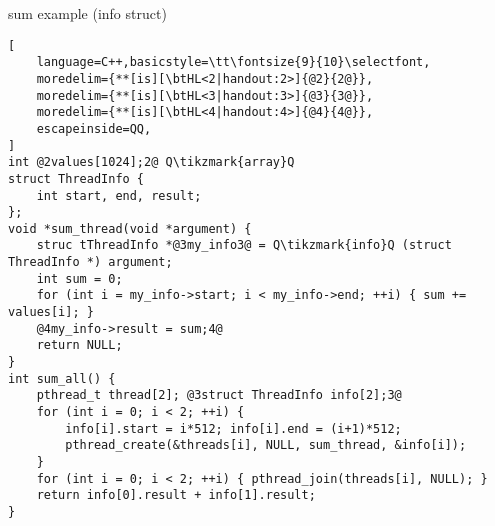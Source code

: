 \begin{frame}[fragile,label=sumToStack]{sum example (info struct)}
\begin{lstlisting}[
    language=C++,basicstyle=\tt\fontsize{9}{10}\selectfont,
    moredelim={**[is][\btHL<2|handout:2>]{@2}{2@}},
    moredelim={**[is][\btHL<3|handout:3>]{@3}{3@}},
    moredelim={**[is][\btHL<4|handout:4>]{@4}{4@}},
    escapeinside=QQ,
]
int @2values[1024];2@ Q\tikzmark{array}Q
struct ThreadInfo {
    int start, end, result;
};
void *sum_thread(void *argument) {
    struc tThreadInfo *@3my_info3@ = Q\tikzmark{info}Q (struct ThreadInfo *) argument;
    int sum = 0;
    for (int i = my_info->start; i < my_info->end; ++i) { sum += values[i]; }
    @4my_info->result = sum;4@
    return NULL;
}
int sum_all() {
    pthread_t thread[2]; @3struct ThreadInfo info[2];3@
    for (int i = 0; i < 2; ++i) {
        info[i].start = i*512; info[i].end = (i+1)*512;
        pthread_create(&threads[i], NULL, sum_thread, &info[i]);
    }
    for (int i = 0; i < 2; ++i) { pthread_join(threads[i], NULL); }
    return info[0].result + info[1].result;
}
\end{lstlisting}
\end{frame}
